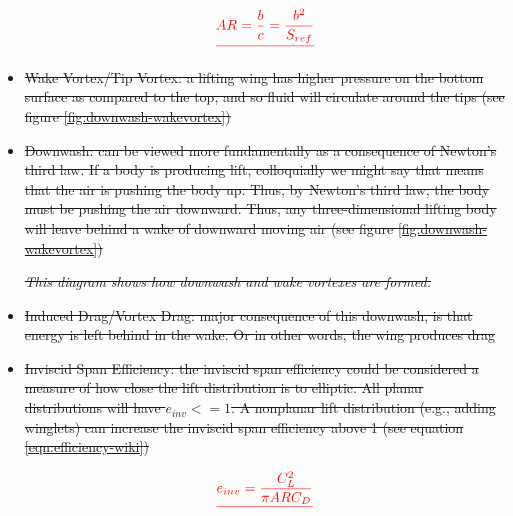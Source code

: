 \documentclass{journal}
\providecommand{\DIFdel}[1]{{\protect\color{red}\sout{#1}}}                      %
\providecommand{\DIFdelFL}[1]{\DIFdel{#1}} %
\begin{document}
\begin{itemize}
\begin{displaymath}
			\DIFdel{AR = \frac{b}{c} = \frac{b^2}{S_{ref}}
		}\end{displaymath}%

\item%
\DIFdel{Wake Vortex/Tip Vortex: a lifting wing has higher pressure on the bottom surface as compared to the top, and so fluid will circulate around the tips (see figure \ref{fig:downwash-wakevortex})
		}%
\item%
\DIFdel{Downwash: can be viewed more fundamentally as a consequence of Newton’s third law. If a body is producing lift, colloquially we might say that means that the air is pushing the body up. Thus, by Newton’s third law, the body must be pushing the air downward. Thus, any three-dimensional lifting body will leave behind a wake of downward moving air (see figure \ref{fig:downwash-wakevortex})
		}%

{%
\emph{\DIFdelFL{This diagram shows how downwash and wake vortexes are formed.}}%
}

\item%
\DIFdel{Induced Drag/Vortex Drag: major consequence of this downwash, is that energy is left behind in the wake. Or in other words, the wing produces drag
		}%
\item%
\DIFdel{Inviscid Span Efficiency:  the inviscid span efficiency could be considered a measure of how close the lift distribution is to elliptic. All planar distributions will have \(e_{inv} <= 1\). A nonplanar lift distribution (e.g., adding winglets) can increase the inviscid span efficiency above 1 (see equation \ref{eqn:efficiency-wiki})
		}%

\begin{displaymath}
			\DIFdel{e_{inv} = \frac{C_L^2}{\pi{ARC_D}}
		}\end{displaymath}%


\end{itemize}
\end{document}
